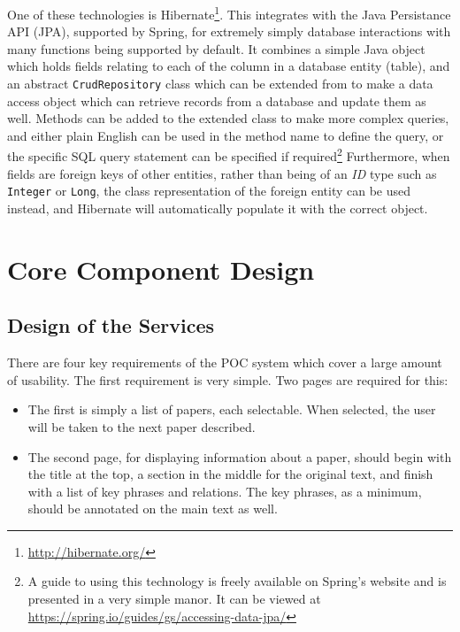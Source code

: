One of these technologies is Hibernate\footnote{\href{http://hibernate.org/}{http://hibernate.org/}}. This integrates with the Java Persistance API (JPA), supported by Spring, for extremely simply database interactions with many functions being supported by default. It combines a simple Java object which holds fields relating to each of the column in a database entity (table), and an abstract \texttt{CrudRepository} class which can be extended from to make a data access object which can retrieve records from a database and update them as well. Methods can be added to the extended class to make more complex queries, and either plain English can be used in the method name to define the query, or the specific SQL query statement can be specified if required\footnote{A guide to using this technology is freely available on Spring's website and is presented in a very simple manor. It can be viewed at \href{https://spring.io/guides/gs/accessing-data-jpa/}{https://spring.io/guides/gs/accessing-data-jpa/}} Furthermore, when fields are foreign keys of other entities, rather than being of an \textit{ID} type such as \texttt{Integer} or \texttt{Long}, the class representation of the foreign entity can be used instead, and Hibernate will automatically populate it with the correct object.

\section{Core Component Design}

\subsection*{Design of the Services}
There are four key requirements of the POC system which cover a large amount of usability. The first requirement is very simple. Two pages are required for this:
\begin{itemize}
	\item The first is simply a list of papers, each selectable. When selected, the user will be taken to the next paper described.
	\item The second page, for displaying information about a paper, should begin with the title at the top, a section in the middle for the original text, and finish with a list of key phrases and relations. The key phrases, as a minimum, should be annotated on the main text as well.
\end{itemize}

